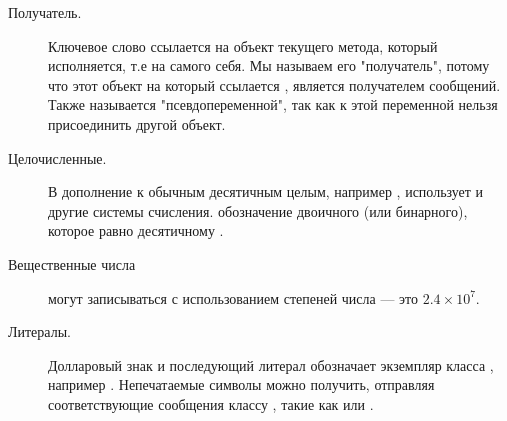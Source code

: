\documentclass[a4paper,10pt,twoside]{book}
\begin{document}
\begin{description}
\item[Получатель.]	Ключевое слово  ссылается на объект текущего метода, который исполняется, т.е на самого себя.
		Мы называем его "получатель", потому что этот объект на который ссылается , является получателем сообщений.
		Также  называется "псевдопеременной", так как к этой переменной нельзя присоединить другой объект.


\item[Целочисленные.] В дополнение к обычным десятичным целым, например , \pharo использует и другие системы счисления.
	 обозначение двоичного  (или бинарного), которое равно десятичному .


\item[Вещественные числа] могут записываться с использованием степеней числа  \mbox{} --- это $2.4\times 10^7$.


\item[Литералы.] Долларовый знак и последующий литерал обозначает экземпляр класса , например .
		Непечатаемые символы можно получить, отправляя соответствующие сообщения классу , такие как  или .
		

\end{description}
\end{document}

